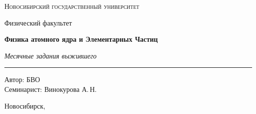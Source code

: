 \documentclass[12pt,a4paper]{report}
\begin{document}
\hypersetup{pageanchor=false}
\begin{titlepage}
    \thispagestyle{empty}

    \begin{center}
        \vspace*{1.5cm}

        {\Large\scshape Новосибирский государственный университет\par}
        \vspace{0.25cm}
        {\large Физический факультет\par}

        \vfill

        {\Huge\bfseries Физика атомного ядра и Элементарных Частиц\par}

        \vspace{0.45cm}

        {\Large\itshape Месячные задания выжившего\par}

        \vspace{0.8cm}

        \rule{0.72\linewidth}{0 pt}





        \vfill

        \begin{flushright}
            \large
            Автор: БВО\\[0.25cm]
            Семинарист: Винокурова А.\,Н.
        \end{flushright}

        \vspace{1.2cm}

        {\large Новосибирск, \the\year}

    \end{center}
\end{titlepage}
\hypersetup{pageanchor=true}

\tableofcontents
\newpage



\clearpage
\end{document}
